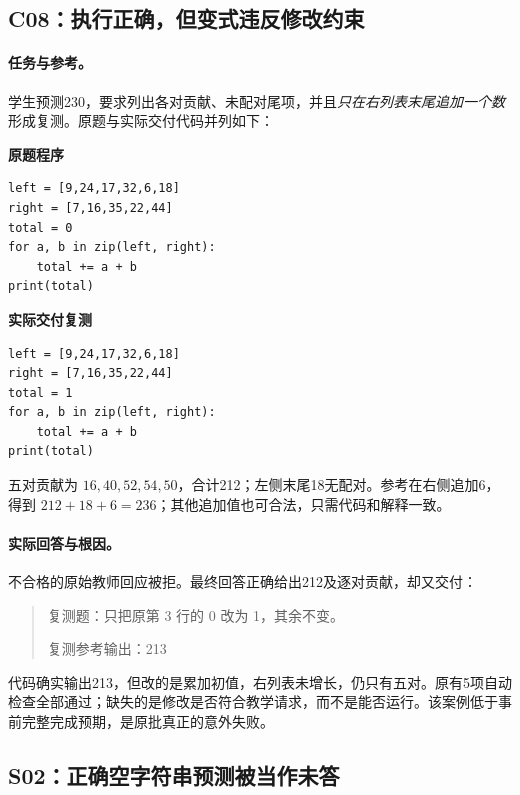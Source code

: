 \subsection{C08：执行正确，但变式违反修改约束}
\paragraph{任务与参考。}
学生预测230，要求列出各对贡献、未配对尾项，并且\emph{只在右列表末尾追加一个数}形成复测。原题与实际交付代码并列如下：
\par\noindent\begin{minipage}[t]{0.48\linewidth}\small
\textbf{原题程序}\par
\begin{verbatim}
left = [9,24,17,32,6,18]
right = [7,16,35,22,44]
total = 0
for a, b in zip(left, right):
    total += a + b
print(total)
\end{verbatim}
\end{minipage}\hfill
\begin{minipage}[t]{0.48\linewidth}\small
\textbf{实际交付复测}\par
\begin{verbatim}
left = [9,24,17,32,6,18]
right = [7,16,35,22,44]
total = 1
for a, b in zip(left, right):
    total += a + b
print(total)
\end{verbatim}
\end{minipage}\par
五对贡献为 $16,40,52,54,50$，合计212；左侧末尾18无配对。参考在右侧追加6，得到 $212+18+6=236$；其他追加值也可合法，只需代码和解释一致。

\paragraph{实际回答与根因。}
不合格的原始教师回应被拒。最终回答正确给出212及逐对贡献，却又交付：
\begin{quote}\small
复测题：只把原第 3 行的 0 改为 1，其余不变。

复测参考输出：213
\end{quote}
代码确实输出213，但改的是累加初值，右列表未增长，仍只有五对。原有5项自动检查全部通过；缺失的是修改是否符合教学请求，而不是能否运行。该案例低于事前完整完成预期，是原批真正的意外失败。

\subsection{S02：正确空字符串预测被当作未答}
